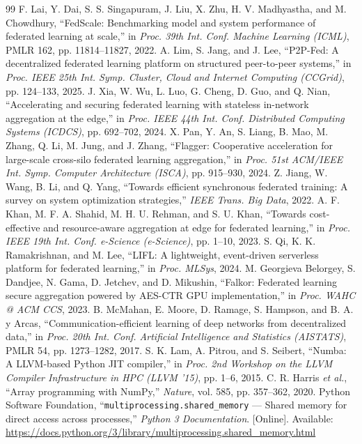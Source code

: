 \documentclass[conference]{IEEEtran}
\begin{document}
\begin{thebibliography}{99}
 F. Lai, Y. Dai, S. S. Singapuram, J. Liu, X. Zhu, H. V. Madhyastha, and M. Chowdhury, ``FedScale: Benchmarking model and system performance of federated learning at scale,'' in \emph{Proc. 39th Int. Conf. Machine Learning (ICML)}, PMLR 162, pp. 11814--11827, 2022.
 A. Lim, S. Jang, and J. Lee, ``P2P-Fed: A decentralized federated learning platform on structured peer-to-peer systems,'' in \emph{Proc. IEEE 25th Int. Symp. Cluster, Cloud and Internet Computing (CCGrid)}, pp. 124--133, 2025.
 J. Xia, W. Wu, L. Luo, G. Cheng, D. Guo, and Q. Nian, ``Accelerating and securing federated learning with stateless in-network aggregation at the edge,'' in \emph{Proc. IEEE 44th Int. Conf. Distributed Computing Systems (ICDCS)}, pp. 692--702, 2024.
 X. Pan, Y. An, S. Liang, B. Mao, M. Zhang, Q. Li, M. Jung, and J. Zhang, ``Flagger: Cooperative acceleration for large-scale cross-silo federated learning aggregation,'' in \emph{Proc. 51st ACM/IEEE Int. Symp. Computer Architecture (ISCA)}, pp. 915--930, 2024.
 Z. Jiang, W. Wang, B. Li, and Q. Yang, ``Towards efficient synchronous federated training: A survey on system optimization strategies,'' \emph{IEEE Trans. Big Data}, 2022.
 A. F. Khan, M. F. A. Shahid, M. H. U. Rehman, and S. U. Khan, ``Towards cost-effective and resource-aware aggregation at edge for federated learning,'' in \emph{Proc. IEEE 19th Int. Conf. e-Science (e-Science)}, pp. 1--10, 2023.
 S. Qi, K. K. Ramakrishnan, and M. Lee, ``LIFL: A lightweight, event-driven serverless platform for federated learning,'' in \emph{Proc. MLSys}, 2024.
 M. Georgieva Belorgey, S. Dandjee, N. Gama, D. Jetchev, and D. Mikushin, ``Falkor: Federated learning secure aggregation powered by AES-CTR GPU implementation,'' in \emph{Proc. WAHC @ ACM CCS}, 2023.
 B. McMahan, E. Moore, D. Ramage, S. Hampson, and B. A. y Arcas, ``Communication-efficient learning of deep networks from decentralized data,'' in \emph{Proc. 20th Int. Conf. Artificial Intelligence and Statistics (AISTATS)}, PMLR 54, pp. 1273--1282, 2017.
 S. K. Lam, A. Pitrou, and S. Seibert, ``Numba: A LLVM-based Python JIT compiler,'' in \emph{Proc. 2nd Workshop on the LLVM Compiler Infrastructure in HPC (LLVM '15)}, pp. 1--6, 2015.
 C. R. Harris \emph{et al.}, ``Array programming with NumPy,'' \emph{Nature}, vol. 585, pp. 357--362, 2020.
 Python Software Foundation, ``\texttt{multiprocessing.shared\_memory} --- Shared memory for direct access across processes,'' \emph{Python 3 Documentation}. [Online]. Available: \url{https://docs.python.org/3/library/multiprocessing.shared_memory.html}

\end{thebibliography}
\end{document}
